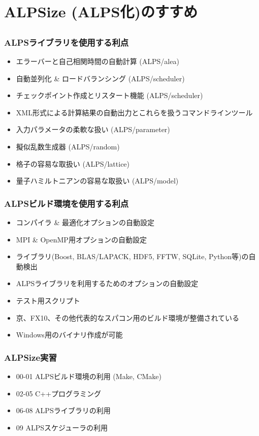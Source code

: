 \section{ALPSize (ALPS化)のすすめ}
\subsection*{\redm\whitem\greenb}

\begin{frame}
  \frametitle{ALPSライブラリを使用する利点}
  \begin{itemize}
  \item エラーバーと自己相関時間の自動計算 (ALPS/alea)
  \item 自動並列化 \& ロードバランシング (ALPS/scheduler)
  \item チェックポイント作成とリスタート機能 (ALPS/scheduler)
  \item XML形式による計算結果の自動出力とこれらを扱うコマンドラインツール
  \item 入力パラメータの柔軟な扱い (ALPS/parameter)
  \item 擬似乱数生成器 (ALPS/random)
  \item 格子の容易な取扱い (ALPS/lattice)
  \item 量子ハミルトニアンの容易な取扱い (ALPS/model)
  \end{itemize}
\end{frame}

\begin{frame}
  \frametitle{ALPSビルド環境を使用する利点}
  \begin{itemize}
  \item コンパイラ \& 最適化オプションの自動設定
  \item MPI \& OpenMP用オプションの自動設定
  \item ライブラリ(Boost, BLAS/LAPACK, HDF5, FFTW, SQLite, Python等)の自動検出
  \item ALPSライブラリを利用するためのオプションの自動設定
  \item テスト用スクリプト
  \item 京、FX10、その他代表的なスパコン用のビルド環境が整備されている
  \item Windows用のバイナリ作成が可能
  \end{itemize}
\end{frame}

\begin{frame}
  \frametitle{ALPSize実習}
  \begin{itemize}
    \setlength{\itemsep}{1em}
  \item 00-01 ALPSビルド環境の利用 (Make, CMake)
  \item 02-05 C++プログラミング
  \item 06-08 ALPSライブラリの利用
  \item 09 ALPSスケジューラの利用
  \end{itemize}
\end{frame}

